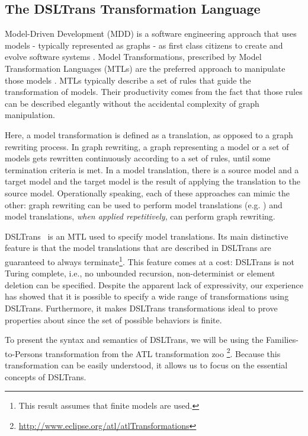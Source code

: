 \subsection{The DSLTrans Transformation Language}

Model-Driven Development (MDD) is a software engineering approach that uses
models - typically represented as graphs - as first class citizens to create and evolve software systems
\cite{Hailpern:2006vd}.
Model Transformations, prescribed by Model Transformation Languages (MTLs) are the preferred approach to manipulate those models \cite{Software2003}.
MTLs typically describe a set of rules that guide the transformation of models.
Their productivity comes from the fact that those rules can be described elegantly without the accidental complexity of graph manipulation.

Here, a model transformation is defined as a translation, as opposed to a graph rewriting process.
In graph rewriting, a graph representing a model or a set of models gets rewritten continuously according to a set of rules, until some termination criteria is met. 
In a model translation, there is a source model and a target model and the target model is the result of applying the translation to the source model.
Operationally speaking, each of these approaches can mimic the other: graph rewriting can be used to perform model translations (e.g. \cite{Grunske2005}) and model translations, \emph{when applied repetitively}, can perform graph rewriting.

DSLTrans~\cite{Barroca2011} is an MTL used to specify model translations.
Its main distinctive feature is that the model translations that are described in DSLTrans are guaranteed to always terminate\footnote{This result assumes that finite models are used.}. This feature comes at a cost: DSLTrans is not Turing complete, i.e., no unbounded recursion, non-determinist or element deletion
can be specified. Despite the apparent lack of expressivity, our experience has showed that it is possible to specify a wide range of transformations using DSLTrans. Furthermore, it makes DSLTrans transformations ideal to prove properties about since the set of possible behaviors is finite.

To present the syntax and semantics of DSLTrans, we will be using the Families-to-Persons transformation from the ATL transformation zoo \footnote{\url{http://www.eclipse.org/atl/atlTransformations}}.
Because this transformation can be easily understood, it allows us to focus on the essential concepts of DSLTrans.

